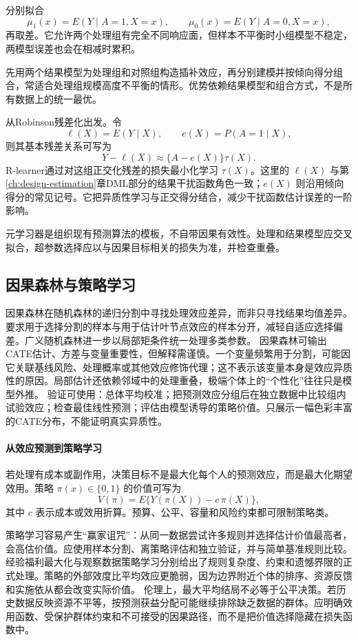 分别拟合
\[
\mu_1(x)=E(Y\mid A=1,X=x),\qquad
\mu_0(x)=E(Y\mid A=0,X=x),
\]
再取差。它允许两个处理组有完全不同响应面，但样本不平衡时小组模型不稳定，两模型误差也会在相减时累积。

先用两个结果模型为处理组和对照组构造插补效应，再分别建模并按倾向得分组合，常适合处理组规模高度不平衡的情形\parencite{kunzel2019}。优势依赖结果模型和组合方式，不是所有数据上的统一最优。

从Robinson残差化出发。令
\[
\ell(X)=E(Y\mid X),\qquad e(X)=P(A=1\mid X),
\]
则其基本残差关系可写为
\[
Y-\ell(X)\approx\{A-e(X)\}\tau(X).
\]
R-learner通过对这组正交化残差的损失最小化学习 $\tau(X)$\parencite{nie2021}。这里的 $\ell(X)$ 与第\ref{ch:design-estimation}章DML部分的结果干扰函数角色一致；$e(X)$ 则沿用倾向得分的常见记号。它把异质性学习与正交得分结合，减少干扰函数估计误差的一阶影响。

元学习器是组织现有预测算法的模板，不自带因果有效性。处理和结果模型应交叉拟合，超参数选择应以与因果目标相关的损失为准，并检查重叠。

\subsection{因果森林与策略学习}

因果森林在随机森林的递归分割中寻找处理效应差异，而非只寻找结果均值差异。要求用于选择分割的样本与用于估计叶节点效应的样本分开，减轻自适应选择偏差。广义随机森林进一步以局部矩条件统一处理多类参数\parencite{wagerathey2018,athey2019}。
因果森林可输出CATE估计、方差与变量重要性，但解释需谨慎。一个变量频繁用于分割，可能因它关联基线风险、处理概率或其他效应修饰代理；这不表示该变量本身是效应异质性的原因。局部估计还依赖邻域中的处理重叠，极端个体上的“个性化”往往只是模型外推。
验证可使用：总体平均校准；把预测效应分组后在独立数据中比较组内试验效应；检查最佳线性预测；评估由模型诱导的策略价值。只展示一幅色彩丰富的CATE分布，不能证明真实异质性。

\paragraph{从效应预测到策略学习}

若处理有成本或副作用，决策目标不是最大化每个人的预测效应，而是最大化期望效用。策略 $\pi(x)\in\{0,1\}$ 的价值可写为
\[
V(\pi)=E\{Y(\pi(X))-c\,\pi(X)\},
\]
其中 $c$ 表示成本或效用折算。预算、公平、容量和风险约束都可限制策略类。

策略学习容易产生“赢家诅咒”：从同一数据尝试许多规则并选择估计价值最高者，会高估价值。应使用样本分割、离策略评估和独立验证，并与简单基准规则比较。经验福利最大化与观察数据策略学习分别给出了规则复杂度、约束和遗憾界限的正式处理\parencite{kitagawatetenov2018,atheywager2021}。策略的外部效度比平均效应更脆弱，因为边界附近个体的排序、资源反馈和实施依从都会改变实际价值。
伦理上，最大平均结局不必等于公平决策。若历史数据反映资源不平等，按预测获益分配可能继续排除缺乏数据的群体。应明确效用函数、受保护群体约束和不可接受的因果路径，而不是把价值选择隐藏在损失函数中。

